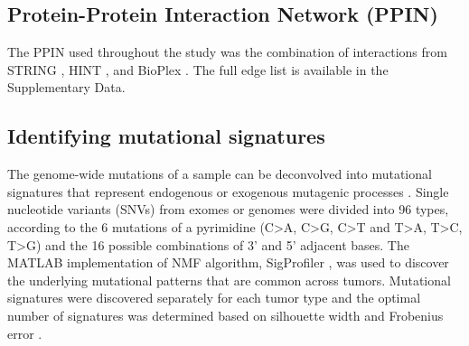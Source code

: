 \documentclass[english, 10pt, letterpaper]{article}
\begin{document}
\subsection*{Protein-Protein Interaction Network (PPIN)}

The PPIN used throughout the study was the combination of interactions from STRING \cite{VonMering2005, Szklarczyk2019}, HINT \cite{Das2012}, and BioPlex \cite{Huttlin2015}.
The full edge list is available in the Supplementary Data.


\subsection*{Identifying mutational signatures}

The genome-wide mutations of a sample can be deconvolved into mutational signatures that represent endogenous or exogenous mutagenic processes \cite{Alexandrov2013}. 
Single nucleotide variants (SNVs) from exomes or genomes were divided into 96 types, according to the 6 mutations of a pyrimidine (C>A, C>G, C>T and T>A, T>C, T>G) and the 16 possible combinations of 3’ and 5’ adjacent bases.
The MATLAB \cite{MATLAB:2010} implementation of NMF algorithm, SigProfiler \cite{Alexandrov2013}, was used to discover the underlying mutational patterns that are common across tumors. 
Mutational signatures were discovered separately for each tumor type and the optimal number of signatures was determined based on silhouette width and Frobenius error \cite{Alexandrov2013DecipheringCancer.}.
\end{document}
